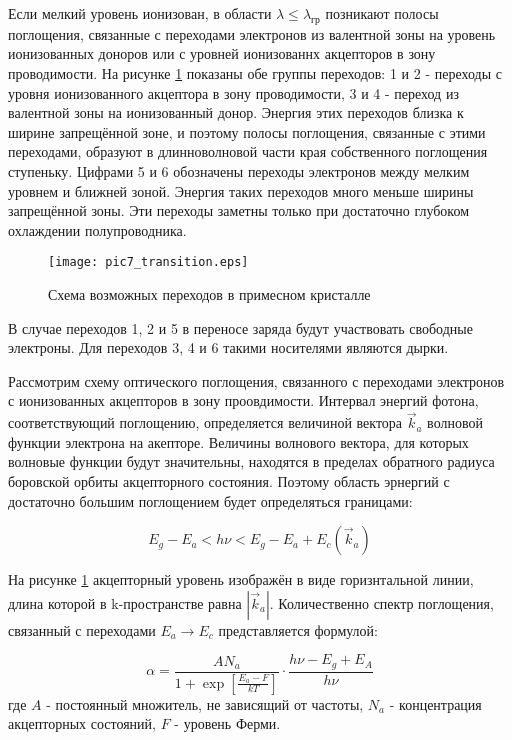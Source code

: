 Если мелкий уровень ионизован, в области $\lambda \le \lambda_{\text{гр}}$ позникают полосы поглощения, связанные с переходами электронов из валентной зоны на уровень ионизованных доноров или с уровней ионизованнх акцепторов в зону проводимости. На рисунке \ref{pic7_transition} показаны обе группы переходов: 1 и 2 - переходы с уровня ионизованного акцептора в зону проводимости, 3 и 4 - переход из валентной зоны на ионизованный донор. Энергия этих переходов близка к ширине запрещённой зоне, и поэтому полосы поглощения, связанные с этими переходами, образуют в длинноволновой части края собственного поглощения ступеньку. Цифрами 5 и 6 обозначены переходы электронов между мелким уровнем и ближней зоной. Энергия таких переходов много меньше ширины запрещённой зоны. Эти переходы заметны только при достаточно глубоком охлаждении полупроводника.

\begin{figure}[h!]\centering
\texttt{[image: pic7\_transition.eps]}
\caption{Схема возможных переходов в примесном кристалле}
\label{pic7_transition}
\end{figure}

В случае переходов 1, 2 и 5 в переносе заряда будут участвовать свободные электроны. Для переходов 3, 4 и 6 такими носителями являются дырки.

Рассмотрим схему оптического поглощения, связанного с переходами электронов с ионизованных акцепторов в зону проовдимости. Интервал энергий фотона, соответствующий поглощению, определяется величиной вектора $\overrightarrow{k}_{a}$ волновой функции электрона на акепторе. Величины волнового вектора, для которых волновые функции будут значительны, находятся в пределах обратного радиуса боровской орбиты акцепторного состояния. Поэтому область эрнергий с достаточно большим поглощением будет определяться границами:

\begin{equation}
E_{g} - E_{a} < h \nu < E_{g} - E_{a} + E_{c}(\overrightarrow{k}_{a})
\end{equation}

На рисунке \ref{pic7_transition} акцепторный уровень изображён в виде горизнтальной линии, длина которой в k-пространстве равна $|\overrightarrow{k}_{a}|$. Количественно спектр поглощения, связанный с переходами $E_{a} \rightarrow E_{c}$ представляется формулой:

\begin{equation}
\alpha = \frac{A N_{a}}{1+\exp \left[ \frac{E_{a} - F}{k T} \right]} \cdot \frac{h \nu - E_{g} + E_{A}}{h \nu}
\end{equation}
где $A$ - постоянный множитель, не зависящий от частоты, $N_{a}$ - концентрация акцепторных состояний, $F$ - уровень Ферми.

